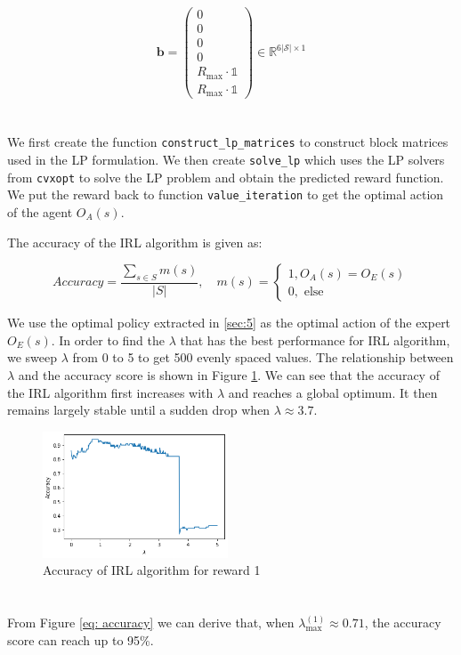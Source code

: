 \begin{equation}
\label{eq: b}
    \mathbf{b}=\left(\begin{array}{c}0 \\ 0 \\ 0 \\ 0 \\ R_{\max } \cdot \mathbb{1} \\ R_{\max } \cdot \mathbb{1}\end{array}\right) \in \mathbb{R}^{6|\mathcal{S}| \times 1}
\end{equation}

\newpage

\section{}\label{sec:11}
We first create the function \verb"construct_lp_matrices" to construct block matrices used in the LP formulation. We then create \verb"solve_lp" which uses the LP solvers from \verb"cvxopt" to solve the LP problem and obtain the predicted reward function. We put the reward back to function \verb"value_iteration" to get the optimal action of the agent $O_{A}(s)$.

The accuracy of the IRL algorithm is given as:

\begin{equation}
\label{eq: accuracy}
    Accuracy=\frac{\sum_{s \in S} m(s)}{|S|}, \quad m(s)=\left\{\begin{array}{l}1, O_{A}(s)=O_{E}(s) \\ 0, \text { else }\end{array}\right.
\end{equation}

We use the optimal policy extracted in \ref{sec:5} as the optimal action of the expert $O_{E}(s)$. In order to find the $\lambda$ that has the best performance for IRL algorithm, we sweep $\lambda$ from 0 to 5 to get 500 evenly spaced values. The relationship between $\lambda$ and the accuracy score is shown in Figure \ref{fig: accuracy1}. We can see that the accuracy of the IRL algorithm first increases with $\lambda$ and reaches a global optimum. It then remains largely stable until a sudden drop when $\lambda \approx 3.7$.

\begin{figure}[!htb]
\centering
  \includegraphics[width=0.49\textwidth]{images/Q11/Accuracy.png}
  \caption{Accuracy of IRL algorithm for reward 1}
\label{fig: accuracy1}
\end{figure}

\section{}\label{sec:12}
From Figure \ref{eq: accuracy} we can derive that, when $\lambda_{\max }^{(1)} \approx 0.71$, the accuracy score can reach up to 95\%.